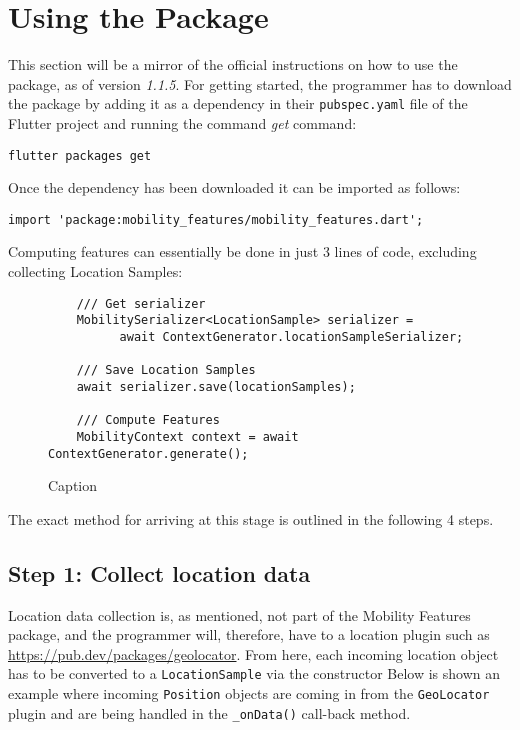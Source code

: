 \section{Using the Package}
This section will be a mirror of the official instructions on how to use the package, as of version \textit{1.1.5}. For getting started, the programmer has to download the package by adding it as a dependency in their \verb|pubspec.yaml| file of the Flutter project and running the command \textit{get} command:

\begin{verbatim}
flutter packages get
\end{verbatim}

Once the dependency has been downloaded it can be imported as follows:

\begin{verbatim}
import 'package:mobility_features/mobility_features.dart';
\end{verbatim}

Computing features can essentially be done in just 3 lines of code, excluding collecting Location Samples:

\begin{figure}
    \centering
    \begin{verbatim}
    /// Get serializer
    MobilitySerializer<LocationSample> serializer =
          await ContextGenerator.locationSampleSerializer;
    
    /// Save Location Samples      
    await serializer.save(locationSamples);
    
    /// Compute Features
    MobilityContext context = await ContextGenerator.generate();
    \end{verbatim}
    \caption{Caption}
    \label{fig:my_label}
\end{figure}

The exact method for arriving at this stage is outlined in the following 4 steps.

\subsection*{Step 1: Collect location data}
Location data collection is, as mentioned, not part of the Mobility Features package, and the programmer will, therefore, have to a location plugin such as \url{https://pub.dev/packages/geolocator}. From here, each incoming location object has to be converted to a \verb|LocationSample| via the constructor
Below is shown an example where incoming \verb|Position| objects are coming in from the \verb|GeoLocator| plugin and are being handled in the \verb|_onData()| call-back method.

